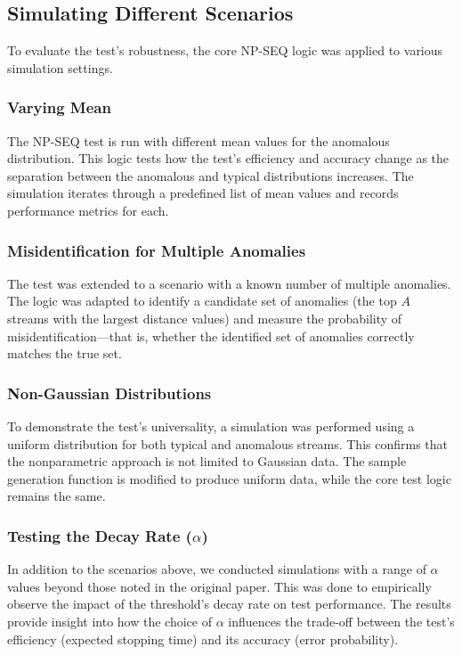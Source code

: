 \subsection{Simulating Different Scenarios}
To evaluate the test's robustness, the core NP-SEQ logic was applied to various simulation settings.
\subsubsection{Varying Mean}
The NP-SEQ test is run with different mean values for the anomalous distribution. This logic tests how the test's efficiency and accuracy change as the separation between the anomalous and typical distributions increases. The simulation iterates through a predefined list of mean values and records performance metrics for each.

\subsubsection{Misidentification for Multiple Anomalies}
The test was extended to a scenario with a known number of multiple anomalies. The logic was adapted to identify a candidate set of anomalies (the top $A$ streams with the largest distance values) and measure the probability of misidentification—that is, whether the identified set of anomalies correctly matches the true set.

\subsubsection{Non-Gaussian Distributions}
To demonstrate the test's universality, a simulation was performed using a uniform distribution for both typical and anomalous streams. This confirms that the nonparametric approach is not limited to Gaussian data. The sample generation function is modified to produce uniform data, while the core test logic remains the same.

\subsubsection{Testing the Decay Rate ($\alpha$)}
In addition to the scenarios above, we conducted simulations with a range of $\alpha$ values beyond those noted in the original paper. This was done to empirically observe the impact of the threshold's decay rate on test performance. The results provide insight into how the choice of $\alpha$ influences the trade-off between the test's efficiency (expected stopping time) and its accuracy (error probability).

